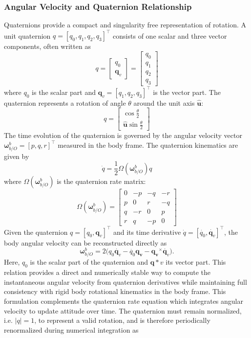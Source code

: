\subsubsection{Angular Velocity and Quaternion Relationship}
Quaternions provide a compact and singularity free representation of rotation. A unit quaternion $q = [q_0, q_1, q_2, q_3]^\top$ consists of one scalar and three vector components, often written as
$$
    q = 
    \begin{bmatrix}
        q_0 \\ \mathbf{q}_v
    \end{bmatrix}
    =
    \begin{bmatrix}
        q_0 \\ q_1 \\ q_2 \\ q_3
    \end{bmatrix}
$$
where $q_0$ is the scalar part and $\mathbf{q}_v = [q_1, q_2, q_3]^\top$ is the vector part.  
The quaternion represents a rotation of angle $\theta$ around the unit axis $\hat{\mathbf{u}}$:
$$
    q =
    \begin{bmatrix}
        \cos\frac{\theta}{2} \\ \hat{\mathbf{u}}\sin\frac{\theta}{2}
    \end{bmatrix}
$$
The time evolution of the quaternion is governed by the angular velocity vector $\boldsymbol{\omega}_{b/O}^{b} = [p, q, r]^\top$ measured in the body frame. The quaternion kinematics are given by
$$
    \dot{q} = \frac{1}{2}\Omega(\boldsymbol{\omega}_{b/O}^{b}) q
$$
where $\Omega(\boldsymbol{\omega}_{b/O}^{b})$ is the quaternion rate matrix:
$$
    \Omega(\boldsymbol{\omega}_{b/O}^{b}) =
    \begin{bmatrix}
        0 & -p & -q & -r \\
        p & 0 & r & -q \\
        q & -r & 0 & p \\
        r & q & -p & 0
    \end{bmatrix}
$$
Given the quaternion $q = [q_0, \mathbf{q}_v]^\top$ and its time derivative $\dot{q} = [\dot{q_0}, \dot{\mathbf{q}_v}]^\top$, the body angular velocity can be reconstructed directly as
$$
    \boldsymbol{\omega}_{b/O}^{b} = 2 \big( q_0\dot{\mathbf{q}_v} - \dot{q_0}\mathbf{\mathbf{q}_v} - \mathbf{\mathbf{q}_v}^{\times}\dot{\mathbf{q}_v} \big).
$$
Here, $q_0$ is the scalar part of the quaternion and $\mathbf{q}*v$ its vector part. This relation provides a direct and numerically stable way to compute the instantaneous angular velocity from quaternion derivatives while maintaining full consistency with rigid body rotational kinematics in the body frame. This formulation complements the quaternion rate equation which integrates angular velocity to update attitude over time. The quaternion must remain normalized, i.e. $|q| = 1$, to represent a valid rotation, and is therefore periodically renormalized during numerical integration as
